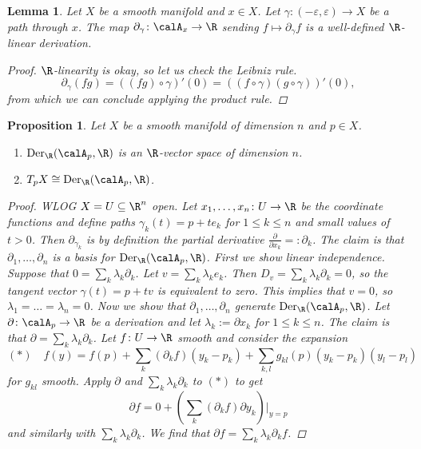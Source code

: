 \documentclass[A4paper, british]{amsart}
\theoremstyle{darkgreentheorem}
\newtheorem{lm}[thm]{Lemma}
\newtheorem{prop}[thm]{Proposition}
\theoremstyle{darkbluedefinition}
\theoremstyle{darkredexample}
\theoremstyle{remark}
\DeclareMathOperator{\Der}{Der}
\newcommand{\1}{\mathbbm{1}}
\newcommand{\sub}{\subseteq}
\begin{document}
\begin{lm}
    Let $X$ be a smooth manifold and $x\in X$.
    Let $\gamma\colon (-\varepsilon, \varepsilon)\to X$ be a path through $x$.
    The map $\partial_{\gamma}\colon \calA_{x}\to \R$ sending $f\mapsto \partial_{\gamma}f$ is a well-defined $\R$-linear derivation.
    \begin{proof}
	$\R$-linearity is okay, so let us check the Leibniz rule.
	\[ \partial_{\gamma}(fg)=((fg)\circ \gamma)'(0)=((f\circ \gamma)(g\circ \gamma))'(0),\]
	from which we can conclude applying the product rule.
    \end{proof}
\end{lm}

\begin{prop}
    Let $X$ be a smooth manifold of dimension $n$ and $p\in X$.
    \begin{enumerate}
	\item $\Der_{\R}(\calA_{p},\R)$ is an $\R$-vector space of dimension $n$.
	\item $T_{p}X\cong \Der_{\R}(\calA_{p},\R)$.
    \end{enumerate}
    \begin{proof}
	WLOG $X=U\sub \R^{n}$ open.
	Let $x_{1},\ldots,x_{n}\colon U\to \R$ be the coordinate functions and define paths $\gamma_{k}(t)=p+te_{k}$ for $1\leqslant k\leqslant n$ and small values of $t>0$.
	Then $\partial_{\gamma_{k}}$ is by definition the partial derivative $\frac{\partial}{\partial x_{k}}=:\partial_{k}$.
	The claim is that $\partial_{1},\ldots,\partial_{n}$ is a basis for $\Der_{\R}(\calA_{p},\R)$.
	First we show linear independence.
	Suppose that $0=\sum_{k}\lambda_{k}\partial_{k}$.
	Let $v=\sum_{k}\lambda_{k}e_{k}$.
	Then $D_{v}=\sum_{k}\lambda_{k}\partial_{k}=0$, so the tangent vector $\gamma(t)=p+tv$ is equivalent to zero.
	This implies that $v=0$, so $\lambda_{1}=\ldots=\lambda_{n}=0$.
	Now we show that $\partial_{1},\ldots,\partial_{n}$ generate $\Der_{\R}(\calA_{p},\R)$.
	Let $\partial\colon \calA_{p}\to \R$ be a derivation and let $\lambda_{k}:=\partial x_{k}$ for $1\leqslant k\leqslant n$.
	The claim is that $\partial =\sum_{k}\lambda_{k}\partial_{k}$.
	Let $f\colon U\to \R$ smooth and consider the expansion
	\[ (*)\quad f(y)=f(p)+\sum_{k}(\partial_{k}f)(y_{k}-p_{k})+\sum_{k,l}g_{kl}(p)(y_{k}-p_{k})(y_{l}-p_{l}) \]
	for $g_{kl}$ smooth.
	Apply $\partial $ and $\sum_{k}\lambda_{k}\partial_{k}$ to $(*)$ to get
	\[ \partial f=0+(\sum_{k}(\partial_{k} f)\partial y_{k})|_{y=p} \]
	and similarly with $\sum_{k}\lambda_{k}\partial_{k}$.
	We find that $\partial f=\sum_{k}\lambda_{k}\partial_{k} f$.
    \end{proof}
\end{prop}
\end{document}
